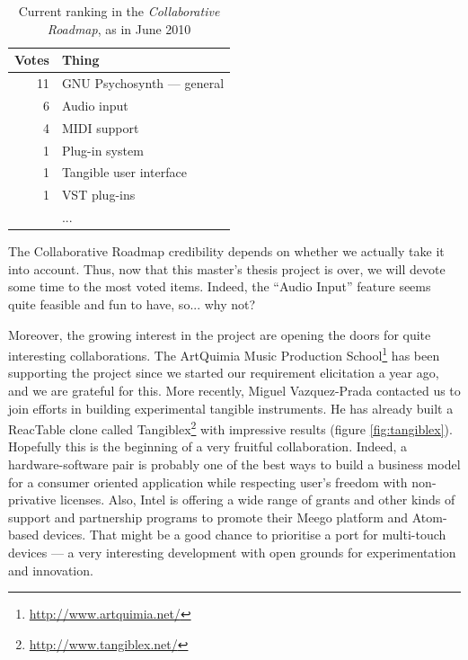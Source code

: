 \begin{table}[h]
  \centering
  \begin{tabular}{r|l}
    Votes & Thing \\ \hline
    11 & GNU Psychosynth --- general \\
    6 & Audio input \\
    4 & MIDI support \\
    1 & Plug-in system \\
    1 & Tangible user interface \\
    1 & VST plug-ins \\
    & ...
  \end{tabular}
  \caption{Current ranking in the \emph{Collaborative Roadmap}, as in June 2010}
  \label{tab:flattr}
\end{table}

The Collaborative Roadmap credibility depends on whether we actually
take it into account. Thus, now that this master's thesis project is
over, we will devote some time to the most voted items. Indeed, the
``Audio Input'' feature seems quite feasible and fun to have,
so... why not?

Moreover, the growing interest in the project are opening the doors
for quite interesting collaborations. The ArtQuimia Music Production
School\footnote{\url{http://www.artquimia.net/}} has been supporting
the project since we started our requirement elicitation a year ago,
and we are grateful for this. More recently, Miguel Vazquez-Prada
contacted us to join efforts in building experimental tangible
instruments. He has already built a ReacTable clone called
Tangiblex\footnote{\url{http://www.tangiblex.net/}} with impressive
results (figure \ref{fig:tangiblex}). Hopefully this is the beginning
of a very fruitful collaboration. Indeed, a hardware-software pair is
probably one of the best ways to build a business model for a consumer
oriented application while respecting user's freedom with
non-privative licenses. Also, Intel is offering a wide range of grants
and other kinds of support and partnership programs to promote their
Meego platform and Atom-based devices. That might be a good chance to
prioritise a port for multi-touch devices --- a very interesting
development with open grounds for experimentation and innovation.

